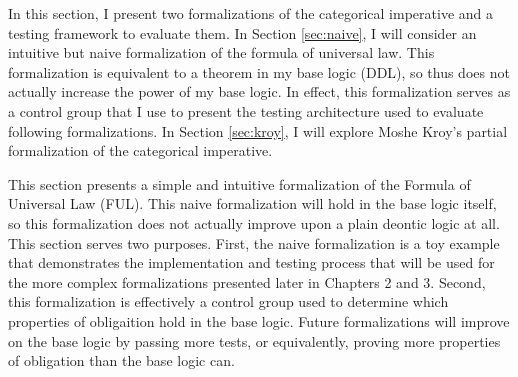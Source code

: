 %
\begin{isabellebody}%
%
%
\isadelimtheory
%
\endisadelimtheory
%
\isatagtheory
%
\endisatagtheory
{\isafoldtheory}%
%
\isadelimtheory
%
\endisadelimtheory
%
\isadelimdocument
%
\endisadelimdocument
%
\isatagdocument
%
\isamarkuptrue%
%
\endisatagdocument
{\isafolddocument}%
%
\isadelimdocument
%
\endisadelimdocument
%
\begin{isamarkuptext}%
In this section, I present two formalizations of the categorical imperative and a testing framework
to evaluate them. In Section \ref{sec:naive}, I will consider an intuitive but naive formalization of 
the formula of universal law. This formalization is equivalent to a theorem in my base logic (DDL), so 
thus does not actually increase the power of my base logic. In effect, this formalization serves as a control
group that I use to present the testing architecture used to evaluate following formalizations.
In Section \ref{sec:kroy}, I will explore Moshe Kroy's partial formalization of 
the categorical imperative.%
\end{isamarkuptext}\isamarkuptrue%
%
\isadelimdocument
%
\endisadelimdocument
%
\isatagdocument
%
\isamarkuptrue%
%
\endisatagdocument
{\isafolddocument}%
%
\isadelimdocument
%
\endisadelimdocument
%
\begin{isamarkuptext}%
This section presents a simple and intuitive formalization of the Formula of Universal Law (FUL). 
This naive formalization will hold in the base logic itself, so this formalization does not actually
improve upon a plain deontic logic at all. This section serves two purposes. First, the naive formalization
is a toy example that demonstrates the implementation and testing process that will be used for the more 
complex formalizations presented later in Chapters 2 and 3. Second, this formalization is effectively
a control group used to determine which properties of obligaition hold in the base logic. Future formalizations
will improve on the base logic by passing more tests, or equivalently, proving more properties of 
obligation than the base logic can.



\end{isamarkuptext}
\end{isabellebody}
